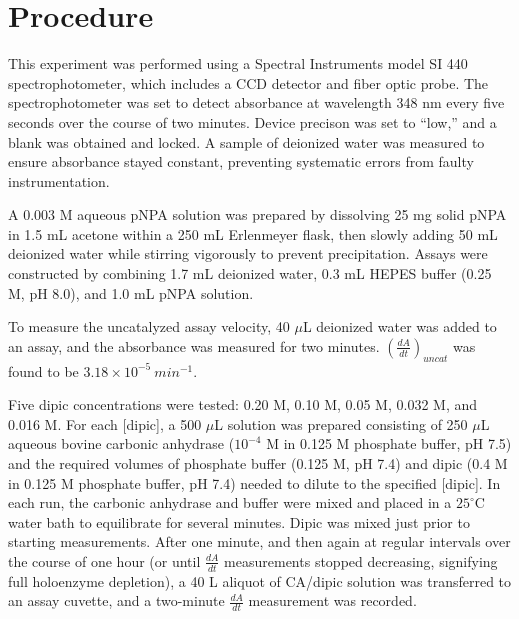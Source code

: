 \section{Procedure}
This experiment was performed using a Spectral Instruments model SI 440 spectrophotometer, which includes a CCD detector and fiber optic probe. The spectrophotometer was set to detect absorbance at wavelength 348 nm every five seconds over the course of two minutes. Device precison was set to ``low,'' and a blank was obtained and locked. A sample of deionized water was measured to ensure absorbance stayed constant, preventing systematic errors from faulty instrumentation.

A 0.003 M aqueous pNPA solution was prepared by dissolving 25 mg solid pNPA in 1.5 mL acetone within a 250 mL Erlenmeyer flask, then slowly adding 50 mL deionized water while stirring vigorously to prevent precipitation. Assays were constructed by combining 1.7 mL deionized water, 0.3 mL HEPES buffer (0.25 M, pH 8.0), and 1.0 mL pNPA solution.

To measure the uncatalyzed assay velocity, 40 $\mu$L deionized water was added to an assay, and the absorbance was measured for two minutes. $\left( \frac{dA}{dt} \right)_{uncat}$ was found to be $3.18\times10^{-5}\ min^{-1}$.

Five dipic concentrations were tested: 0.20 M, 0.10 M, 0.05 M, 0.032 M, and 0.016 M. For each [dipic], a 500 $\mu$L solution was prepared consisting of 250 $\mu$L aqueous bovine carbonic anhydrase ($10^{-4}$ M in 0.125 M phosphate buffer, pH 7.5) and the required volumes of phosphate buffer (0.125 M, pH 7.4) and dipic (0.4 M in 0.125 M phosphate buffer, pH 7.4) needed to dilute to the specified [dipic]. In each run, the carbonic anhydrase and buffer were mixed and placed in a $25^{\circ}$C water bath to equilibrate for several minutes. Dipic was mixed just prior to starting measurements. After one minute, and then again at regular intervals over the course of one hour (or until $\frac{dA}{dt}$ measurements stopped decreasing, signifying full holoenzyme depletion), a 40 {\textmu}L aliquot of CA/dipic solution was transferred to an assay cuvette, and a two-minute $\frac{dA}{dt}$ measurement was recorded. 